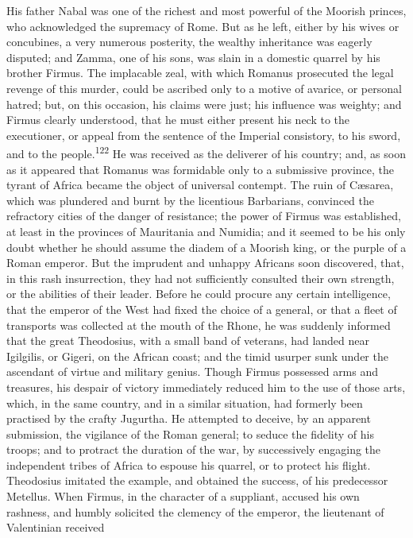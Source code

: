His father Nabal was one of the richest and most powerful of the
Moorish princes, who acknowledged the supremacy of Rome. But as
he left, either by his wives or concubines, a very numerous
posterity, the wealthy inheritance was eagerly disputed; and
Zamma, one of his sons, was slain in a domestic quarrel by his
brother Firmus. The implacable zeal, with which Romanus
prosecuted the legal revenge of this murder, could be ascribed
only to a motive of avarice, or personal hatred; but, on this
occasion, his claims were just; his influence was weighty; and
Firmus clearly understood, that he must either present his neck
to the executioner, or appeal from the sentence of the Imperial
consistory, to his sword, and to the people.\textsuperscript{122} He was received
as the deliverer of his country; and, as soon as it appeared that
Romanus was formidable only to a submissive province, the tyrant
of Africa became the object of universal contempt. The ruin of
Cæsarea, which was plundered and burnt by the licentious
Barbarians, convinced the refractory cities of the danger of
resistance; the power of Firmus was established, at least in the
provinces of Mauritania and Numidia; and it seemed to be his only
doubt whether he should assume the diadem of a Moorish king, or
the purple of a Roman emperor. But the imprudent and unhappy
Africans soon discovered, that, in this rash insurrection, they
had not sufficiently consulted their own strength, or the
abilities of their leader. Before he could procure any certain
intelligence, that the emperor of the West had fixed the choice
of a general, or that a fleet of transports was collected at the
mouth of the Rhone, he was suddenly informed that the great
Theodosius, with a small band of veterans, had landed near
Igilgilis, or Gigeri, on the African coast; and the timid usurper
sunk under the ascendant of virtue and military genius. Though
Firmus possessed arms and treasures, his despair of victory
immediately reduced him to the use of those arts, which, in the
same country, and in a similar situation, had formerly been
practised by the crafty Jugurtha. He attempted to deceive, by an
apparent submission, the vigilance of the Roman general; to
seduce the fidelity of his troops; and to protract the duration
of the war, by successively engaging the independent tribes of
Africa to espouse his quarrel, or to protect his flight.
Theodosius imitated the example, and obtained the success, of his
predecessor Metellus. When Firmus, in the character of a
suppliant, accused his own rashness, and humbly solicited the
clemency of the emperor, the lieutenant of Valentinian received
